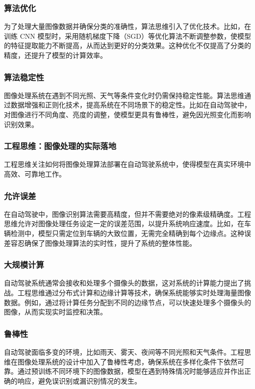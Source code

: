 \subsubsection*{算法优化}
为了处理大量图像数据并确保分类的准确性，算法思维引入了优化技术。比如，在训练 CNN 模型时，采用随机梯度下降（SGD）等优化算法不断调整参数，使模型的特征提取能力不断提高，从而达到更好的分类效果。这种优化不仅提高了分类的精度，还提升了模型的计算效率。

\subsubsection*{算法稳定性}
图像处理系统在遇到不同光照、天气等条件变化时仍需保持稳定性能。算法思维通过数据增强和正则化技术，提高系统在不同场景下的稳定性。比如在自动驾驶中，对图像进行不同角度、亮度的调整，使模型更具有鲁棒性，避免因光照变化而影响识别效果。

\subsubsection{ 工程思维：图像处理的实际落地}

工程思维关注如何将图像处理算法部署在自动驾驶系统中，使得模型在真实环境中高效、可靠地工作。

\subsubsection*{允许误差}在自动驾驶中，图像识别算法需要高精度，但并不需要绝对的像素级精确度。工程思维允许对图像处理任务设定一定的误差范围，以提升系统响应速度。比如，在车辆检测中，模型只需定位到车辆的大致位置，无需完全精确到每个边缘点。这种误差容忍确保了图像处理算法的实时性，提升了系统的整体性能。

\subsubsection*{大规模计算}
自动驾驶系统通常会接收和处理多个摄像头的数据，这对系统的计算能力提出了挑战。工程思维通过分布式计算和边缘计算等技术，确保系统能够实时处理海量图像数据。例如，通过将计算任务分配到不同的边缘节点，可以快速处理多个摄像头的图像，从而实现实时监控和决策。

\subsubsection*{鲁棒性}
自动驾驶面临多变的环境，比如雨天、雾天、夜间等不同光照和天气条件。工程思维在图像处理系统的设计中加入了鲁棒性考虑，确保系统在多样化条件下依然可靠。通过预训练不同环境下的图像数据，模型在遇到特殊情况时能够适应并作出正确的响应，避免误识别或漏识别情况的发生。

